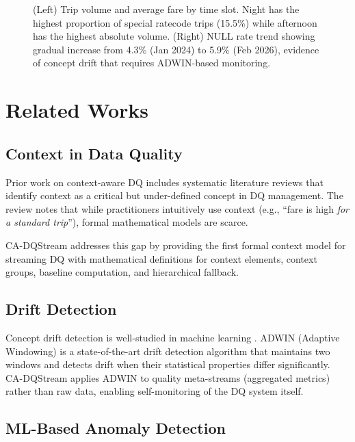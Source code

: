 \begin{figure}[H]
\centering
{}
\caption{(Left) Trip volume and average fare by time slot. Night has the highest proportion of special ratecode trips (15.5\%) while afternoon has the highest absolute volume. (Right) NULL rate trend showing gradual increase from 4.3\% (Jan 2024) to 5.9\% (Feb 2026), evidence of concept drift that requires ADWIN-based monitoring.}
\end{figure}

\section{Related Works}

\subsection{Context in Data Quality}

Prior work on context-aware DQ includes systematic literature reviews \citep{contextdq2022} that identify context as a critical but under-defined concept in DQ management. The review notes that while practitioners intuitively use context (e.g., ``fare is high \emph{for a standard trip}''), formal mathematical models are scarce.

CA-DQStream addresses this gap by providing the first formal context model for streaming DQ with mathematical definitions for context elements, context groups, baseline computation, and hierarchical fallback.

\subsection{Drift Detection}

Concept drift detection is well-studied in machine learning \citep{lu2018learning}. ADWIN (Adaptive Windowing) \citep{bifet2007learning, adwin2025} is a state-of-the-art drift detection algorithm that maintains two windows and detects drift when their statistical properties differ significantly. CA-DQStream applies ADWIN to quality meta-streams (aggregated metrics) rather than raw data, enabling self-monitoring of the DQ system itself.

\subsection{ML-Based Anomaly Detection}

